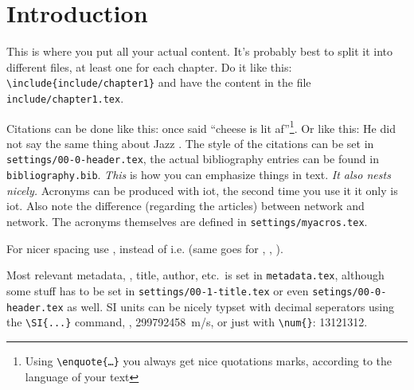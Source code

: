 \chapter{Introduction}
This is where you put all your actual content.
It's probably best to split it into different files, at least one for each chapter.
Do it like this: \texttt{\textbackslash{}include\{include/chapter1\}} and have the content in the file \texttt{include/chapter1.tex}.

Citations can be done like this: \textcite{adorno1980gesammelte} once said \enquote{cheese is lit af}\footnote{Using \texttt{\textbackslash{}enquote\{\dots\}} you always get nice quotations marks, according to the language of your text}.
Or like this: He did not say the same thing about Jazz \autocite{adorno1980gesammelte}.
The style of the citations can be set in \texttt{settings/00-0-header.tex}, the actual bibliography entries can be found in \texttt{bibliography.bib}.
\emph{This} is how you can emphasize things in text. \emph{It also \emph{nests} nicely.}
Acronyms can be produced with \ac{iot}, the second time you use it it only is \ac{iot}.
Also note the difference (regarding the articles) between  network and  network.
The acronyms themselves are defined in \texttt{settings/myacros.tex}.

For nicer spacing use \ie, instead of i.e. (same goes for \eg, \ua, \zb).

Most relevant metadata, \eg, title, author, etc.\ is set in \texttt{metadata.tex}, although some stuff has to be set in \texttt{settings/00-1-title.tex} or even \texttt{setings/00-0-header.tex} as well.
SI units can be nicely typset with decimal seperators using the \texttt{\textbackslash{}SI\{...\}} command, \eg, \SI{299792458}{m/s}, or just with \texttt{\textbackslash{}num\{\}}: \num{13121312}.

\Blindtext[2]


\Blinddocument
